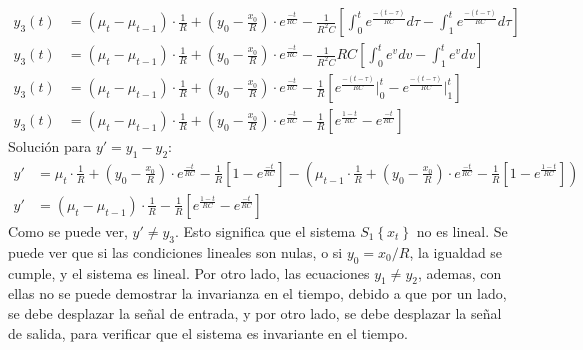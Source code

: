 \documentclass[12pt,a4paper]{report}
\begin{document}
\begin{enumerate}[label=\alph*)]
\begin{align*}
        y_3(t) &= (\mu_t - \mu_{t-1}) \cdot \frac{1}{R} + \left(y_0 - \frac{x_0}{R}\right) \cdot e^{\frac{-t}{RC}} -
        \frac{1}{R^2C} \left[\int_{0}^{t} e^{\frac{-(t-\tau)}{RC}} d\tau -
          \int_{1}^{t} e^{\frac{-(t-\tau)}{RC}} d\tau \right]\\[6pt]
        y_3(t) &= (\mu_t - \mu_{t-1}) \cdot \frac{1}{R} + \left(y_0 - \frac{x_0}{R}\right) \cdot e^{\frac{-t}{RC}} -
          \frac{1}{R^2C} RC\left[\int_{0}^{t} e^v dv - \int_{1}^{t} e^v dv \right]\\[6pt]
        y_3(t) &= (\mu_t - \mu_{t-1}) \cdot \frac{1}{R} + \left(y_0 - \frac{x_0}{R}\right) \cdot e^{\frac{-t}{RC}} -
          \frac{1}{R}\left[e^{\frac{-(t-\tau)}{RC}} \Big|_{0}^{t} -
          e^{\frac{-(t-\tau)}{RC}} \Big|_{1}^{t} \right]\\[6pt]
        y_3(t) &= (\mu_t - \mu_{t-1}) \cdot \frac{1}{R} + \left(y_0 - \frac{x_0}{R}\right) \cdot e^{\frac{-t}{RC}} -
          \frac{1}{R} \left[e^{\frac{1-t}{RC}} - e^{\frac{-t}{RC}}\right]
      \end{align*}
      Solución para $y' = y_1 - y_2$:
      \begin{align*}
        y' &= \mu_t \cdot \frac{1}{R} + \left(y_0 - \frac{x_0}{R}\right) \cdot e^{\frac{-t}{RC}} - \frac{1}{R}
          \left[1 - e^{\frac{-t}{RC}}\right] - \left(\mu_{t-1} \cdot \frac{1}{R} + \left(y_0 -
          \frac{x_0}{R}\right) \cdot e^{\frac{-t}{RC}} - \frac{1}{R} \left[1 - e^{\frac{1-t}{RC}}\right]\right)\\[6pt]
        y' &= (\mu_t - \mu_{t-1}) \cdot \frac{1}{R} - \frac{1}{R} \left[e^{\frac{1-t}{RC}} - e^{\frac{-t}{RC}}\right]
      \end{align*}
      Como se puede ver, $y' \neq y_3$. Esto significa que el sistema $S_1\left\{x_t\right\}$ no es lineal. Se puede
      ver que si las condiciones lineales son nulas, o si $y_0 = x_0/R$, la igualdad se cumple, y el sistema es lineal.
      Por otro lado, las ecuaciones $y_1 \neq y_2$, ademas, con ellas no se puede demostrar la invarianza en el tiempo,
      debido a que por un lado, se debe desplazar la señal de entrada, y por otro lado, se debe desplazar la señal de
      salida, para verificar que el sistema es invariante en el tiempo.\\


\end{enumerate}
\end{document}
